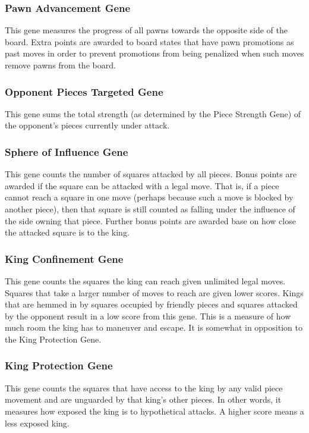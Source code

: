 \documentclass[letterpaper]{article}
\renewcommand\_{\textunderscore\allowbreak}
\begin{document}
\subsubsection{Pawn Advancement Gene}
This gene measures the progress of all pawns towards the opposite side of the board. Extra points are awarded to board states that have pawn promotions as past moves in order to prevent promotions from being penalized when such moves remove pawns from the board.

\subsubsection{Opponent Pieces Targeted Gene}
This gene sums the total strength (as determined by the Piece Strength Gene) of the opponent's pieces currently under attack.

\subsubsection{Sphere of Influence Gene}
This gene counts the number of squares attacked by all pieces. Bonus points are awarded if the square can be attacked with a legal move. That is, if a piece cannot reach a square in one move (perhaps because such a move is blocked by another piece), then that square is still counted as falling under the influence of the side owning that piece. Further bonus points are awarded base on how close the attacked square is to the king.

\subsubsection{King Confinement Gene}
This gene counts the squares the king can reach given unlimited legal moves. Squares that take a larger number of moves to reach are given lower scores. Kings that are hemmed in by squares occupied by friendly pieces and squares attacked by the opponent result in a low score from this gene. This is a measure of how much room the king has to maneuver and escape. It is somewhat in opposition to the King Protection Gene.

\subsubsection{King Protection Gene}
This gene counts the squares that have access to the king by any valid piece movement and are unguarded by that king's other pieces. In other words, it measures how exposed the king is to hypothetical attacks. A higher score means a less exposed king.
\end{document}
